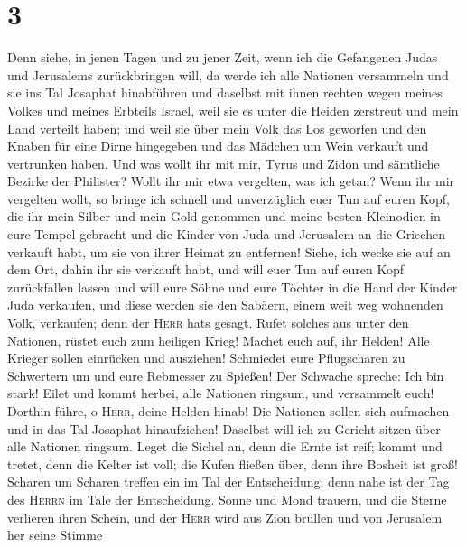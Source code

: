 \hypertarget{section-2}{%
\section{3}\label{section-2}}

 Denn siehe, in jenen Tagen und zu jener Zeit, wenn ich
die Gefangenen Judas und Jerusalems zurückbringen will, 
da werde ich alle Nationen versammeln und sie ins Tal Josaphat
hinabführen und daselbst mit ihnen rechten wegen meines Volkes und
meines Erbteils Israel, weil sie es unter die Heiden zerstreut und mein
Land verteilt haben;  und weil sie über mein Volk das Los
geworfen und den Knaben für eine Dirne hingegeben und das Mädchen um
Wein verkauft und vertrunken haben.  Und was wollt ihr mit
mir, Tyrus und Zidon und sämtliche Bezirke der Philister? Wollt ihr mir
etwa vergelten, was ich getan? Wenn ihr mir vergelten wollt, so bringe
ich schnell und unverzüglich euer Tun auf euren Kopf,  die
ihr mein Silber und mein Gold genommen und meine besten Kleinodien in
eure Tempel gebracht  und die Kinder von Juda und
Jerusalem an die Griechen verkauft habt, um sie von ihrer Heimat zu
entfernen!  Siehe, ich wecke sie auf an dem Ort, dahin ihr
sie verkauft habt, und will euer Tun auf euren Kopf zurückfallen lassen
 und will eure Söhne und eure Töchter in die Hand der
Kinder Juda verkaufen, und diese werden sie den Sabäern, einem weit weg
wohnenden Volk, verkaufen; denn der \textsc{Herr} hat\textquotesingle s
gesagt.  Rufet solches aus unter den Nationen, rüstet euch
zum heiligen Krieg! Machet euch auf, ihr Helden! Alle Krieger sollen
einrücken und ausziehen!  Schmiedet eure Pflugscharen zu
Schwertern um und eure Rebmesser zu Spießen! Der Schwache spreche: Ich
bin stark!  Eilet und kommt herbei, alle Nationen
ringsum, und versammelt euch! Dorthin führe, o \textsc{Herr}, deine
Helden hinab!  Die Nationen sollen sich aufmachen und in
das Tal Josaphat hinaufziehen! Daselbst will ich zu Gericht sitzen über
alle Nationen ringsum.  Leget die Sichel an, denn die
Ernte ist reif; kommt und tretet, denn die Kelter ist voll; die Kufen
fließen über, denn ihre Bosheit ist groß!  Scharen um
Scharen treffen ein im Tal der Entscheidung; denn nahe ist der Tag des
\textsc{Herrn} im Tale der Entscheidung.  Sonne und Mond
trauern, und die Sterne verlieren ihren Schein,  und der
\textsc{Herr} wird aus Zion brüllen und von Jerusalem her seine Stimme
